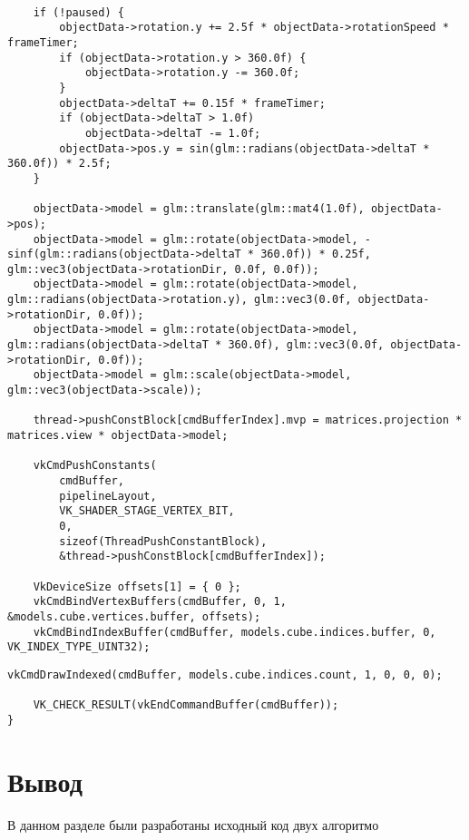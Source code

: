 \begin{lstlisting}[caption=Параллельный рендеринг]

	if (!paused) {
		objectData->rotation.y += 2.5f * objectData->rotationSpeed * frameTimer;
		if (objectData->rotation.y > 360.0f) {
			objectData->rotation.y -= 360.0f;
		}
		objectData->deltaT += 0.15f * frameTimer;
		if (objectData->deltaT > 1.0f)
			objectData->deltaT -= 1.0f;
		objectData->pos.y = sin(glm::radians(objectData->deltaT * 360.0f)) * 2.5f;
	}

	objectData->model = glm::translate(glm::mat4(1.0f), objectData->pos);
	objectData->model = glm::rotate(objectData->model, -sinf(glm::radians(objectData->deltaT * 360.0f)) * 0.25f, glm::vec3(objectData->rotationDir, 0.0f, 0.0f));
	objectData->model = glm::rotate(objectData->model, glm::radians(objectData->rotation.y), glm::vec3(0.0f, objectData->rotationDir, 0.0f));
	objectData->model = glm::rotate(objectData->model, glm::radians(objectData->deltaT * 360.0f), glm::vec3(0.0f, objectData->rotationDir, 0.0f));
	objectData->model = glm::scale(objectData->model, glm::vec3(objectData->scale));

	thread->pushConstBlock[cmdBufferIndex].mvp = matrices.projection * matrices.view * objectData->model;

	vkCmdPushConstants(
		cmdBuffer,
		pipelineLayout,
		VK_SHADER_STAGE_VERTEX_BIT,
		0,
		sizeof(ThreadPushConstantBlock),
		&thread->pushConstBlock[cmdBufferIndex]);

	VkDeviceSize offsets[1] = { 0 };
	vkCmdBindVertexBuffers(cmdBuffer, 0, 1, &models.cube.vertices.buffer, offsets);
	vkCmdBindIndexBuffer(cmdBuffer, models.cube.indices.buffer, 0, VK_INDEX_TYPE_UINT32);
\end{lstlisting}
\begin{lstlisting}[caption=Параллельный рендеринг]
	vkCmdDrawIndexed(cmdBuffer, models.cube.indices.count, 1, 0, 0, 0);

	VK_CHECK_RESULT(vkEndCommandBuffer(cmdBuffer));
}
\end{lstlisting}
 
\section{Вывод}

В данном разделе были разработаны исходный код двух алгоритмо

